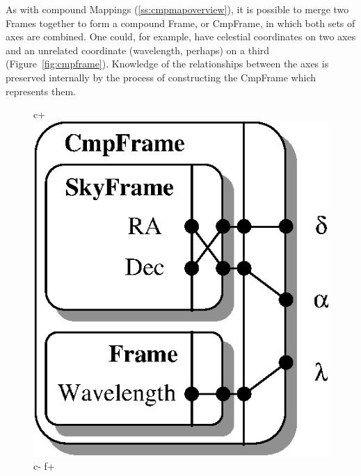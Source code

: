 \documentclass[twoside,11pt]{article}
\newenvironment{latexonly}{}{}
\newcommand{\secref}[1]{\S\ref{#1}}
\renewcommand{\secref}[1]{\ref{#1}}
\begin{document}
\begin{latexonly}
   As with compound Mappings (\secref{ss:cmpmapoverview}), it is possible
   to merge two Frames together to form a compound Frame, or CmpFrame, in
   which both sets of axes are combined.  One could, for example, have
   celestial coordinates on two axes and an unrelated coordinate
   (wavelength, perhaps) on a third (Figure~\ref{fig:cmpframe}).
   Knowledge of the relationships between the axes is preserved
   internally by the process of constructing the CmpFrame which
   represents them.
   \begin{figure}
   \begin{center}
c+
   \includegraphics[scale=0.85]{sun211_figures/cmpframe.eps}
c-
f+

\end{center}
\end{figure}
\end{latexonly}
\end{document}
